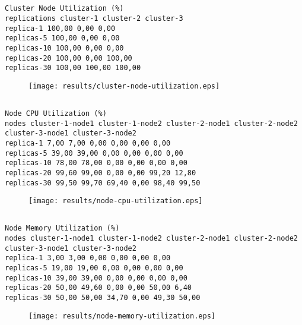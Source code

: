 \documentclass{elsart}
\begin{document}
\subsection{}

\begin{lstlisting}[caption={}]
Cluster Node Utilization (%)
replications cluster-1 cluster-2 cluster-3
replica-1 100,00 0,00 0,00
replicas-5 100,00 0,00 0,00
replicas-10 100,00 0,00 0,00
replicas-20 100,00 0,00 100,00
replicas-30 100,00 100,00 100,00
\end{lstlisting}

\begin{figure}[ht]
\centering
\texttt{[image: results/cluster-node-utilization.eps]}
\caption{}\label{fig:cluster-node-utilization.eps}
\end{figure}

\subsection{}

\begin{lstlisting}[caption={}]
Node CPU Utilization (%)
nodes cluster-1-node1 cluster-1-node2 cluster-2-node1 cluster-2-node2 cluster-3-node1 cluster-3-node2
replica-1 7,00 7,00 0,00 0,00 0,00 0,00
replicas-5 39,00 39,00 0,00 0,00 0,00 0,00
replicas-10 78,00 78,00 0,00 0,00 0,00 0,00
replicas-20 99,60 99,00 0,00 0,00 99,20 12,80
replicas-30 99,50 99,70 69,40 0,00 98,40 99,50
\end{lstlisting}

\begin{figure}[ht]
\centering
\texttt{[image: results/node-cpu-utilization.eps]}
\caption{}\label{fig:node-cpu-utilization.eps}
\end{figure}

\subsection{}

\begin{lstlisting}[caption={}]
Node Memory Utilization (%)
nodes cluster-1-node1 cluster-1-node2 cluster-2-node1 cluster-2-node2 cluster-3-node1 cluster-3-node2
replica-1 3,00 3,00 0,00 0,00 0,00 0,00
replicas-5 19,00 19,00 0,00 0,00 0,00 0,00
replicas-10 39,00 39,00 0,00 0,00 0,00 0,00
replicas-20 50,00 49,60 0,00 0,00 50,00 6,40
replicas-30 50,00 50,00 34,70 0,00 49,30 50,00
\end{lstlisting}

\begin{figure}[ht]
\centering
\texttt{[image: results/node-memory-utilization.eps]}
\caption{}\label{fig:node-memory-utilization.eps}
\end{figure}
\end{document}
